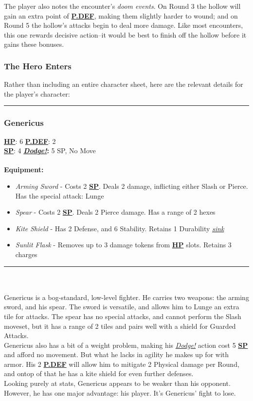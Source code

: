 \documentclass[12pt]{article}
\newcommand{\refto}[1]{\hyperlink{#1}{\textbf{#1}}}
\newcommand{\reftoit}[1]{\hyperlink{#1}{\emph{#1}}}
\begin{document}
\begin{multicols*}{2}
\columnbreak

The player also notes the encounter’s \emph{doom events}. On Round 3 the hollow will gain an extra point of \refto{P.DEF}, making them slightly harder to wound; and on Round 5 the hollow’s attacks begin to deal more damage. Like most encounters, this one rewards decisive action--it would be best to finish off the hollow before it gains these bonuses.

\subsubsection*{The Hero Enters}
Rather than including an entire character sheet, here are the relevant details for the player’s character:\\
\hrule
\subsubsection*{Genericus}
\refto{HP}: 6 \hspace*{2cm} \refto{P.DEF}: 2\\
\refto{SP}: 4 \hspace*{2.1cm} \textbf{\reftoit{Dodge!}:} 5 SP, No Move\\\\
\textbf{Equipment:}
\begin{itemize}
\item \emph{Arming Sword} - Costs 2 \refto{SP}. Deals 2 damage, inflicting either Slash or Pierce. Has the special attack: Lunge
\item \emph{Spear} - Costs 2 \refto{SP}. Deals 2 Pierce damage. Has a range of 2 hexes
\item \emph{Kite Shield} - Has 2 Defense, and 6 Stability. Retains 1 Durability \reftoit{sink}
\item \emph{Sunlit Flask} - Removes up to 3 damage tokens from \refto{HP} slots. Retains 3 charges
\end{itemize}
\hrule
\ \\ \ \\
Genericus is a bog-standard, low-level fighter. He carries two weapons: the arming sword, and his spear. The sword is versatile, and allows him to Lunge an extra tile for attacks. The spear has no special attacks, and cannot perform the Slash moveset, but it has a range of 2 tiles and pairs well with a shield for Guarded Attacks.\\
Genericus also has a bit of a weight problem, making his \reftoit{Dodge!} action cost 5 \refto{SP} and afford no movement. But what he lacks in agility he makes up for with armor. His 2 \refto{P.DEF} will allow him to mitigate 2 Physical damage per Round, and ontop of that he has a kite shield for even further defenses.\\
Looking purely at stats, Genericus appears to be weaker than his opponent. However, he has one major advantage: his player. It’s Genericus’ fight to lose.
\end{multicols*}
\pagebreak
\end{document}
